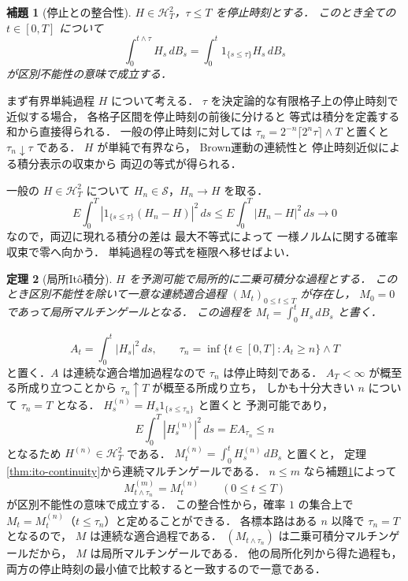 \documentclass[a5paper,10pt,onecolumn]{jsarticle}
\makeatletter
\theoremstyle{mathnotetheorem}
\newtheorem{theorem}{定理}[section]
\newtheorem{lemma}[theorem]{補題}
\renewcommand{\proofname}{証明}
\renewenvironment{proof}[1][\proofname]{%
  \par\pushQED{\qed}\normalfont\topsep4\p@\@plus2\p@\relax
  \trivlist\item[\hskip\labelsep\bfseries #1]\ignorespaces
}{\popQED\endtrivlist\@endpefalse}
\makeatother
\begin{document}
\begin{lemma}[停止との整合性]\label{lem:stop}
$H\in\mathcal H^2_T$，$\tau\le T$ を停止時刻とする．
このとき全ての $t\in[0,T]$ について
\[
 \int_0^{t\wedge\tau}H_s\,dB_s
 =\int_0^t1_{\{s\le\tau\}}H_s\,dB_s
\]
が区別不能性の意味で成立する．
\end{lemma}
\begin{proof}
まず有界単純過程 $H$ について考える．
$\tau$ を決定論的な有限格子上の停止時刻で近似する場合，
各格子区間を停止時刻の前後に分けると
等式は積分を定義する和から直接得られる．
一般の停止時刻に対しては
$\tau_n=2^{-n}\lceil2^n\tau\rceil\wedge T$
と置くと $\tau_n\downarrow\tau$ である．
$H$ が単純で有界なら，
Brown運動の連続性と
停止時刻近似による積分表示の収束から
両辺の等式が得られる．

一般の $H\in\mathcal H^2_T$ について
$H_n\in\mathcal S$，$H_n\to H$ を取る．
\[
 E\int_0^T
 |1_{\{s\le\tau\}}(H_n-H)|^2\,ds
 \le E\int_0^T|H_n-H|^2\,ds\to0
\]
なので，両辺に現れる積分の差は
最大不等式によって
一様ノルムに関する確率収束で零へ向かう．
単純過程の等式を極限へ移せばよい．
\end{proof}

\begin{theorem}[局所It\^o積分]\label{thm:local}
$H$ を予測可能で局所的に二乗可積分な過程とする．
このとき区別不能性を除いて一意な連続適合過程
$(M_t)_{0\le t\le T}$ が存在し，
$M_0=0$ であって局所マルチンゲールとなる．
この過程を
$M_t=\int_0^tH_s\,dB_s$ と書く．
\end{theorem}
\begin{proof}
\[
 A_t=\int_0^t|H_s|^2\,ds,\qquad
 \tau_n=\inf\{t\in[0,T]:A_t\ge n\}\wedge T
\]
と置く．$A$ は連続な適合増加過程なので
$\tau_n$ は停止時刻である．
$A_T<\infty$ が概至る所成り立つことから
$\tau_n\uparrow T$ が概至る所成り立ち，
しかも十分大きい $n$ について $\tau_n=T$ となる．
$H^{(n)}_s=H_s1_{\{s\le\tau_n\}}$ と置くと
予測可能であり，
\[
 E\int_0^T|H^{(n)}_s|^2\,ds
 =E A_{\tau_n}\le n
\]
となるため $H^{(n)}\in\mathcal H^2_T$ である．
$M^{(n)}_t=\int_0^tH^{(n)}_s\,dB_s$ と置くと，
定理\ref{thm:ito-continuity}から連続マルチンゲールである．
$n\le m$ なら補題\ref{lem:stop}によって
\[
 M^{(m)}_{t\wedge\tau_n}=M^{(n)}_{t}
 \qquad(0\le t\le T)
\]
が区別不能性の意味で成立する．
この整合性から，確率 $1$ の集合上で
$M_t=M^{(n)}_t$（$t\le\tau_n$）と定めることができる．
各標本路はある $n$ 以降で $\tau_n=T$ となるので，
$M$ は連続な適合過程である．
$(M_{t\wedge\tau_n})$ は二乗可積分マルチンゲールだから，
$M$ は局所マルチンゲールである．
他の局所化列から得た過程も，
両方の停止時刻の最小値で比較すると一致するので一意である．
\end{proof}
\end{document}
